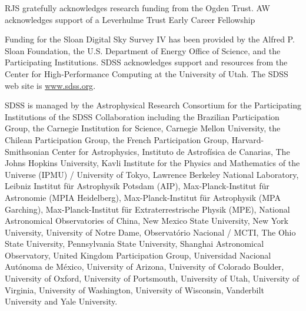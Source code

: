 \documentclass[useAMS,usenatbib]{mn2e}
\begin{document}
RJS gratefully acknowledges research funding from the Ogden Trust. AW acknowledges support of a Leverhulme Trust Early Career Fellowship

Funding for the Sloan Digital Sky Survey IV has been provided by the
Alfred P. Sloan Foundation, the U.S. Department of Energy Office of
Science, and the Participating Institutions. SDSS acknowledges
support and resources from the Center for High-Performance Computing at the University of Utah. The SDSS web site is \url{www.sdss.org}.

SDSS is managed by the Astrophysical Research Consortium for the Participating Institutions of the SDSS Collaboration including the Brazilian Participation Group, the Carnegie Institution for Science, Carnegie Mellon University, the Chilean Participation Group, the French Participation Group, Harvard-Smithsonian Center for Astrophysics, Instituto de Astrof\'isica de Canarias, The Johns Hopkins University, Kavli Institute for the Physics and Mathematics of the Universe (IPMU) / University of Tokyo, Lawrence Berkeley National Laboratory, Leibniz Institut für Astrophysik Potsdam (AIP), Max-Planck-Institut f\"ur Astronomie (MPIA Heidelberg), Max-Planck-Institut für Astrophysik (MPA Garching), Max-Planck-Institut f\"ur Extraterrestrische Physik (MPE), National Astronomical Observatories of China, New Mexico State University, New York University, University of Notre Dame, Observat\'orio Nacional / MCTI, The Ohio State University, Pennsylvania State University, Shanghai Astronomical Observatory, United Kingdom Participation Group, Universidad Nacional Aut\'onoma de M\'exico, University of Arizona, University of Colorado Boulder, University of Oxford, University of Portsmouth, University of Utah, University of Virginia, University of Washington, University of Wisconsin, Vanderbilt University and Yale University.


  



\end{document}
